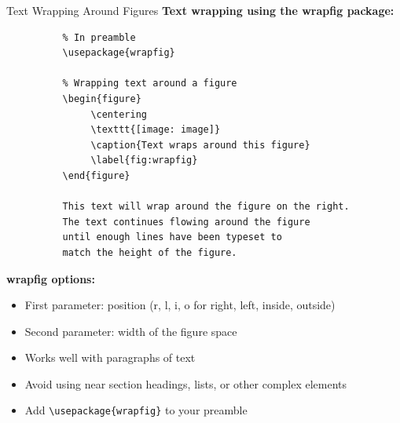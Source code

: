 \begin{frame}[fragile]{Text Wrapping Around Figures}
     \textbf{Text wrapping using the wrapfig package:}
     \begin{lstlisting}
          % In preamble
          \usepackage{wrapfig}
          
          % Wrapping text around a figure
          \begin{figure}
               \centering
               \texttt{[image: image]}
               \caption{Text wraps around this figure}
               \label{fig:wrapfig}
          \end{figure}
          
          This text will wrap around the figure on the right.
          The text continues flowing around the figure
          until enough lines have been typeset to
          match the height of the figure.
     \end{lstlisting}
     
     \textbf{wrapfig options:}
     \begin{itemize}
          \item First parameter: position (r, l, i, o for right, left, inside, outside)
          \item Second parameter: width of the figure space
          \item Works well with paragraphs of text
          \item Avoid using near section headings, lists, or other complex elements
          \item Add \texttt{\textbackslash usepackage\{wrapfig\}} to your preamble
     \end{itemize}
\end{frame}

